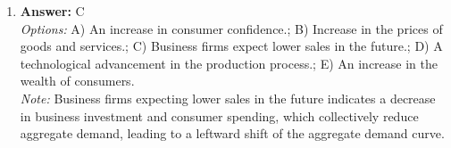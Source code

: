 \documentclass[12pt]{article}
\begin{document}
\begin{enumerate}[label=\arabic*.]
\\ \textit{Note:} The correct answer is 75 percent because economic growth is calculated using the formula: ((GDP per capita in 2000 - GDP per capita in 1990) / GDP per capita in 1990) x 100, which in this case is ((15000 - 10000) / 10000) x 100 = 50\%.
\item \textbf{Answer:} C
\\ \textit{Options:} A) An increase in consumer confidence.; B) Increase in the prices of goods and services.; C) Business firms expect lower sales in the future.; D) A technological advancement in the production process.; E) An increase in the wealth of consumers.
\\ \textit{Note:} Business firms expecting lower sales in the future indicates a decrease in business investment and consumer spending, which collectively reduce aggregate demand, leading to a leftward shift of the aggregate demand curve.
\end{enumerate}
\end{document}
